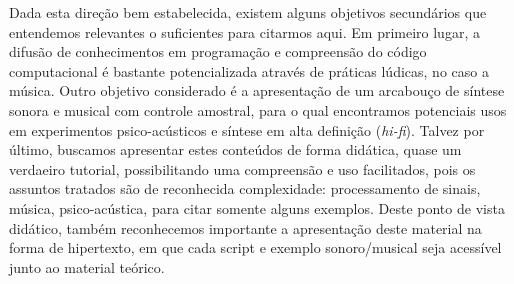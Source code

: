 Dada esta direção bem estabelecida, existem alguns objetivos secundários que entendemos relevantes o suficientes para citarmos aqui. Em primeiro lugar, a difusão de conhecimentos em programação e compreensão do código computacional é bastante potencializada através de práticas lúdicas, no caso a música. Outro objetivo considerado é a apresentação de um arcabouço de síntese sonora e musical com controle amostral, para o qual encontramos potenciais usos em experimentos psico-acústicos e síntese em alta definição (\emph{hi-fi}). Talvez por último, buscamos apresentar estes conteúdos de forma didática, quase um verdaeiro tutorial, possibilitando uma compreensão e uso facilitados, pois os assuntos tratados são de reconhecida complexidade: processamento de sinais, música, psico-acústica, para citar somente alguns exemplos. Deste ponto de vista didático, também reconhecemos importante a apresentação deste material na forma de hipertexto, em que cada script e exemplo sonoro/musical seja acessível junto ao material teórico.
  
